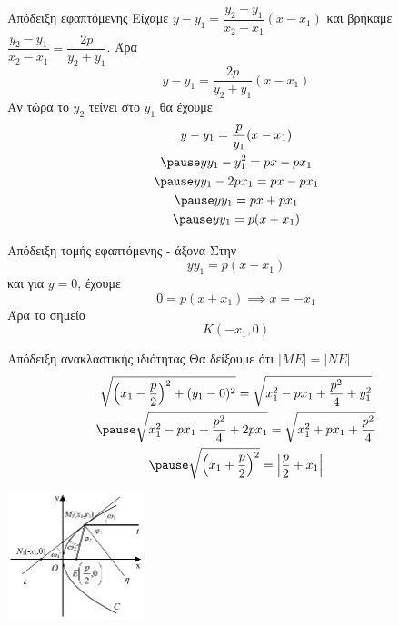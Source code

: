 \documentclass{../../presentation}
\begin{document}
\begin{frame}{Απόδειξη εφαπτόμενης}
  Είχαμε $y-y_1=\dfrac{y_2-y_1}{x_2-x_1}(x-x_1)$
  και βρήκαμε $\dfrac{y_2-y_1}{x_2-x_1}=\dfrac{2p}{y_2+y_1}$.
  Άρα
  $$y-y_1=\dfrac{2p}{y_2+y_1}(x-x_1)$$
  Αν τώρα το $y_2$ τείνει στο $y_1$ θα έχουμε
  \begin{gather*}
    y-y_1=\dfrac{p}{y_1}(x-x_1) \\ \pause
    yy_1-y_1^2=px-px_1 \\ \pause
    yy_1-2px_1=px-px_1 \\ \pause
    yy_1=px+px_1 \\ \pause
    yy_1=p(x+x_1)
  \end{gather*}

  \hyperlink{Εφαπτόμενη}{}
\end{frame}

\begin{frame}[label=Απόδειξη1]{Απόδειξη τομής εφαπτόμενης - άξονα}
  Στην
  $$yy_1=p(x+x_1)$$
  και για $y=0$, έχουμε
  $$0=p(x+x_1)\implies x=-x_1$$
  Άρα το σημείο $$Κ(-x_1,0)$$
  \hyperlink{Ιδιότητες}{}
\end{frame}

\begin{frame}[label=Απόδειξη2]{Απόδειξη ανακλαστικής ιδιότητας}
  Θα δείξουμε ότι $|ΜΕ|=|ΝΕ|$
  \begin{gather*}
    \sqrt{\left( x_1-\frac{p}{2} \right)^2+(y_1-0)^2 }=\sqrt{x_1^2-px_1+\frac{p^2}{4}+y_1^2 } \\ \pause
    \sqrt{x_1^2-px_1+\frac{p^2}{4}+2px_1 }=\sqrt{x_1^2+px_1+\frac{p^2}{4} } \\ \pause
    \sqrt{\left( x_1+\frac{p}{2} \right)^2}=\left| \frac{p}{2}+x_1 \right|
  \end{gather*}

  \centering
  \includegraphics[width=0.3\textwidth]{"../images/reflection.png"}

  \hyperlink{Ιδιότητες}{}
\end{frame}
\end{document}
